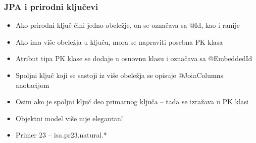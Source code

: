 \documentclass[compress]{beamer}
\begin{document}
\begin{frame}
  \frametitle{JPA i prirodni ključevi}
  \begin{itemize}
    \item Ako prirodni ključ čini jedno obeležje, on se označava sa @Id, kao i ranije
    \item Ako ima više obeležja u ključu, mora se napraviti posebna PK klasa
    \item Atribut tipa PK klase se dodaje u osnovnu klasu i označava sa @EmbeddedId
  \end{itemize}

  \begin{itemize}
    \item Spoljni ključ koji se sastoji iz više obeležja se opisuje @JoinColumns anotacijom
    \item Osim ako je spoljni ključ deo primarnog ključa -- tada se izražava u PK klasi
    \item Objektni model više nije elegantan!
  \end{itemize}

  \begin{itemize}
    \item Primer 23 -- isa.pr23.natural.*
  \end{itemize}
\end{frame}
\end{document}
